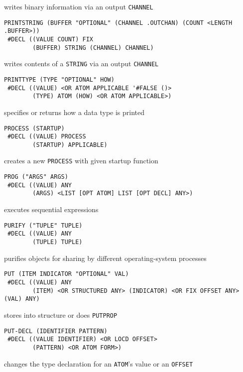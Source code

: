 \documentclass[a4paper]{scrbook}
\begin{document}
writes binary information via an output \texttt{CHANNEL}

\begin{verbatim}
PRINTSTRING (BUFFER "OPTIONAL" (CHANNEL .OUTCHAN) (COUNT <LENGTH .BUFFER>))
 #DECL ((VALUE COUNT) FIX
        (BUFFER) STRING (CHANNEL) CHANNEL)
\end{verbatim}

writes contents of a \texttt{STRING} via an output \texttt{CHANNEL}

\begin{verbatim}
PRINTTYPE (TYPE "OPTIONAL" HOW)
 #DECL ((VALUE) <OR ATOM APPLICABLE '#FALSE ()>
        (TYPE) ATOM (HOW) <OR ATOM APPLICABLE>)
\end{verbatim}

specifies or returns how a data type is printed

\begin{verbatim}
PROCESS (STARTUP)
 #DECL ((VALUE) PROCESS
        (STARTUP) APPLICABLE)
\end{verbatim}

creates a new \texttt{PROCESS} with given startup function

\begin{verbatim}
PROG ("ARGS" ARGS)
 #DECL ((VALUE) ANY
        (ARGS) <LIST [OPT ATOM] LIST [OPT DECL] ANY>)
\end{verbatim}

executes sequential expressions

\begin{verbatim}
PURIFY ("TUPLE" TUPLE)
 #DECL ((VALUE) ANY
        (TUPLE) TUPLE)
\end{verbatim}

purifies objects for sharing by different operating-system processes

\begin{verbatim}
PUT (ITEM INDICATOR "OPTIONAL" VAL)
 #DECL ((VALUE) ANY
        (ITEM) <OR STRUCTURED ANY> (INDICATOR) <OR FIX OFFSET ANY> (VAL) ANY)
\end{verbatim}

stores into structure or does \texttt{PUTPROP}

\begin{verbatim}
PUT-DECL (IDENTIFIER PATTERN)
 #DECL ((VALUE IDENTIFIER) <OR LOCD OFFSET>
        (PATTERN) <OR ATOM FORM>)
\end{verbatim}

changes the type declaration for an \texttt{ATOM}'s value or an \texttt{OFFSET}
\end{document}
